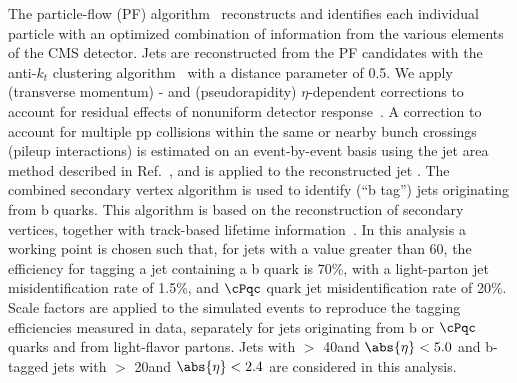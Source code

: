 The particle-flow (PF) algorithm~\cite{CMS-PAS-PFT-09-001,CMS-PAS-PFT-10-001} reconstructs and identifies each individual particle with an optimized combination of information from the various elements of the CMS detector. 
Jets are reconstructed from the PF candidates with the anti-$k_t$ clustering
algorithm~\cite{Cacciari:2008gp} with a distance parameter of 0.5. We apply
 (transverse momentum) \pt- and (pseudorapidity) $\eta$-dependent corrections to account for residual
effects of nonuniform detector response~\cite{Chatrchyan:2011ds}.
A correction to account for multiple pp collisions within the same or nearby
bunch crossings (pileup interactions) is estimated on an event-by-event basis using the
jet area method described in Ref.~\cite{Cacciari:2007fd}, and is
applied to the reconstructed jet \pt.
The combined secondary vertex algorithm is used to identify (``b tag'') jets 
originating from b quarks.  This algorithm 
 is based on the reconstruction of secondary vertices, together with track-based lifetime information~\cite{Chatrchyan:2012jua}. 
In this analysis a working point is chosen such that, for jets with a \PT value greater than 60\GeV, the efficiency for tagging a jet containing a b quark is 70\%, with a light-parton jet misidentification rate of 1.5\%, and $\cPqc$ quark jet misidentification rate of 20\%.
Scale factors are applied to the simulated events to reproduce the tagging efficiencies measured in data, 
separately for jets originating from b or $\cPqc$ quarks and from light-flavor partons.
Jets with  \PT $>$ 40\GeV and $\abs{\eta} < 5.0$ and b-tagged jets with \PT $>$ 20\GeV and $\abs{\eta} < 2.4$ are considered in this analysis.


